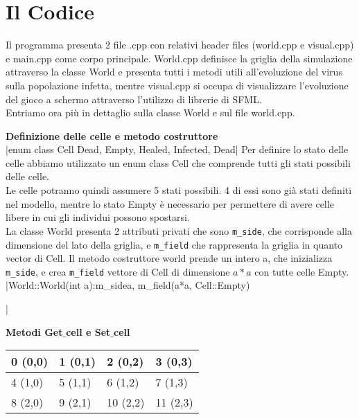 \documentclass{article}
\begin{document}
\section{Il Codice}

\hspace{\parindent}Il programma presenta 2 file .cpp con relativi header files
(world.cpp e visual.cpp) e main.cpp come corpo principale. 
World.cpp definisce la griglia della simulazione attraverso la classe World e 
presenta tutti i metodi utili all'evoluzione del virus sulla popolazione infetta, 
mentre visual.cpp si occupa di visualizzare l'evoluzione del gioco a schermo 
attraverso l'utilizzo di librerie di SFML. \\
Entriamo ora più in dettaglio sulla classe World e sul file world.cpp. 

\begin{enumerate}
    \item \textbf{Definizione delle celle e metodo costruttore}\\
    |enum class Cell {Dead, Empty, Healed, Infected, Dead}|
    Per definire lo stato delle celle abbiamo utilizzato un enum class Cell che 
    comprende tutti gli stati possibili delle celle. \\
    Le celle potranno quindi assumere 5 stati possibili. 4 di essi sono già stati 
    definiti nel modello, mentre lo stato Empty è necessario per permettere di avere 
    celle libere in cui gli individui possono spostarsi. \\
    La classe World presenta 2 attributi privati che sono \verb|m_side|, che 
    corrisponde alla dimensione del lato della griglia, e \verb|m_field| che 
    rappresenta la griglia in quanto vector di Cell. Il metodo costruttore world 
    prende un intero a, che inizializza \verb|m_side|, e crea \verb|m_field| vettore 
    di Cell di dimensione $a*a$ con tutte celle Empty. 
    |World::World(int a):m_side{a}, m_field(a*a, Cell::Empty){|
    \item \textbf{Metodi Get$\_$cell e Set$\_$cell}\\
    \begin{center}
    \begin{tabular}{ | m{4em} | m{4em} | m{4em} | m{4em} |}
        \hline 
        0 (0,0) & 1 (0,1) & 2 (0,2) & 3 (0,3) \\
        \hline
        4 (1,0) & 5 (1,1) & 6 (1,2) & 7 (1,3) \\
        \hline 
        8 (2,0) & 9 (2,1) & 10 (2,2) & 11 (2,3) \\

\end{tabular}
\end{center}}
\end{enumerate}
\end{document}
